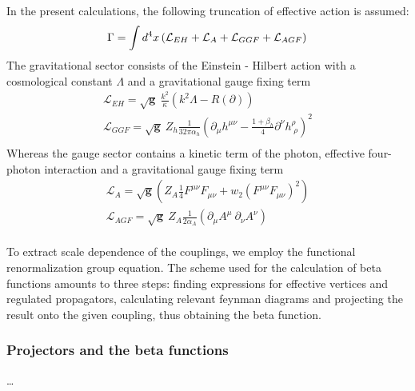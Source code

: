 \documentclass[11pt, a4paper]{article}
\begin{document}
In the present calculations, the following truncation of effective action is assumed:
\begin{equation}
    \Gamma = \int d^4 x \left( \mathcal{L}_{EH} + \mathcal{L}_A + \mathcal{L}_{GGF} + \mathcal{L}_{AGF} \right) \\
\end{equation}
The gravitational sector consists of the Einstein - Hilbert action with a cosmological constant $\Lambda$ and a gravitational gauge fixing term
\begin{gather}
    \mathcal{L}_{EH} = \sqrt{\mathbf{g}} \ \frac{k^2}{\kappa} \left( k^2 \Lambda - R(\partial)\right) \\
    \mathcal{L}_{GGF} = \sqrt{\mathbf{g}} \ Z_h \frac{1}{32 \pi \alpha_h} \left(\partial_\mu h^{\mu\nu} - \frac{1+\beta_h}{4} \partial^\nu h^\rho_{\; \rho} \right)^2\\
\end{gather}
Whereas the gauge sector contains a kinetic term of the photon, effective four-photon interaction and a gravitational gauge fixing term
\begin{gather}
    \mathcal{L}_A =  \sqrt{\mathbf{g}} \left( Z_A \frac{1}{4} F^{\mu\nu} F_{\mu\nu} + w_2 (F^{\mu\nu} F_{\mu\nu})^2 \right)\\
    \mathcal{L}_{AGF} = \sqrt{\mathbf{g}} \ Z_A \frac{1}{2 \alpha_A} \left( \partial_\mu A^\mu \ \partial_\nu A^\nu \right) \\
\end{gather}

To extract scale dependence of the couplings, we employ the functional renormalization group equation.
The scheme used for the calculation of beta functions amounts to three steps: finding expressions for effective vertices and
regulated propagators, calculating relevant feynman diagrams and projecting the result onto the given coupling, thus obtaining the beta function.
\subsubsection{Projectors and the beta functions}
\dots
\end{document}
